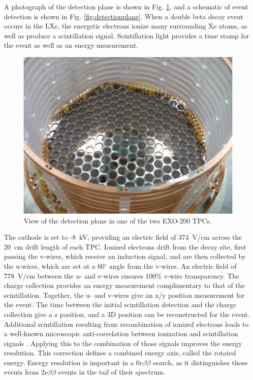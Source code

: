 A photograph of the detection plane is shown in Fig. \ref{fig:tpcphoto}, and a schematic of event detection is shown in Fig. \ref{fig:detectionplane}.  When a double beta decay event occurs in the LXe, the energetic electrons ionize many surrounding Xe atoms, as well as produce a scintillation signal.  Scintillation light provides a time stamp for the event as well as an energy measurement.

\begin{figure} %
	\centering
	\includegraphics[width=.9\textwidth]{figures/TPCphoto.jpeg}
	\caption{View of the detection plane in one of the two EXO-200 TPCs.}
\label{fig:tpcphoto}
\end{figure}

The cathode is set to -8~kV, providing an electric field of 374~V/cm across the 20~cm drift length of each TPC.  Ionized electrons drift from the decay site, first passing the v-wires, which receive an induction signal, and are then collected by the u-wires, which are set at a 60$^\circ$ angle from the v-wires.  An electric field of 778~V/cm between the u- and v-wires ensures 100\% v-wire transparency.  The charge collection provides an energy measurement complimentary to that of the scintillation.  Together, the u- and v-wires give an x/y position measurement for the event.  The time between the initial scintillation detection and the charge collection give a z position, and a 3D position can be reconstructed for the event.  \cite{EXO200TwoNuLong}  Additional scintillation resulting from recombination of ionized electrons leads to a well-known microscopic anti-correlation between ionization and scintillation signals \cite{anticorr}.  Applying this to the combination of those signals improves the energy resolution.  This correction defines a combined energy axis, called the rotated energy.  Energy resolution is important in a $0\nu\beta\beta$ search, as it distinguishes those events from $2\nu\beta\beta$ events in the tail of their spectrum.

